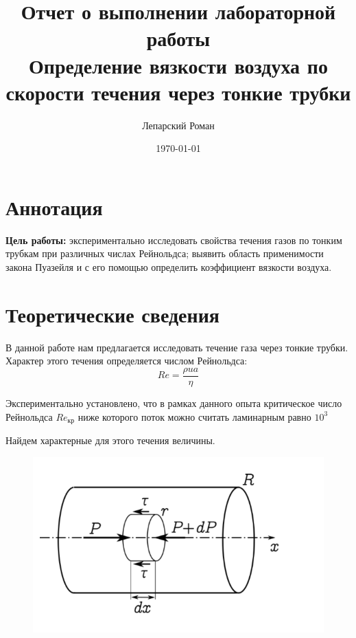 \documentclass[12pt]{article}
\title{Отчет о выполнении лабораторной работы \\ Определение вязкости воздуха по скорости течения через тонкие трубки}
\author{Лепарский Роман}
\date{\today}
\begin{document}
\maketitle

\newpage

\section{Аннотация}

\textbf{Цель работы:} экспериментально исследовать свойства течения газов по тонким трубкам при различных числах Рейнольдса; выявить область применимости закона Пуазейля и с его помощью определить коэффициент вязкости воздуха.

\section{Теоретические сведения}

 В данной работе нам предлагается исследовать течение газа через тонкие трубки. Характер этого течения определяется числом Рейнольдса:
 \begin{equation}
 	Re = \frac{\rho u a}{\eta}
 	\label{eq:reinolds}
 \end{equation}
 
 Экспериментально установлено, что в рамках данного опыта критическое число Рейнольдса $Re_{\text{кр}}$ ниже которого поток можно считать ламинарным равно $10^3$
 
 Найдем характерные для этого течения величины. 
 
 \begin{figure}[H]
 	\centering
 	\includegraphics[scale = 0.3]{./images/puasel.png}
 	\label{fig:puasel}
 \end{figure}
 
\end{document}
